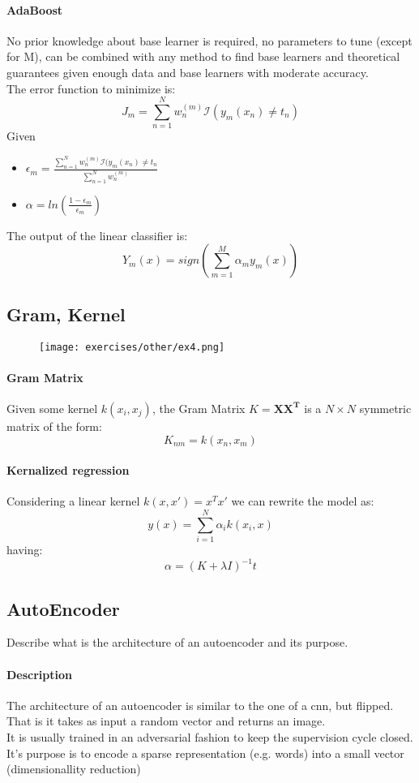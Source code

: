 \paragraph{AdaBoost}
No prior knowledge about base learner is required, no parameters to tune (except for M), can be combined with any method to find base learners and theoretical guarantees given enough data and base learners with moderate accuracy.\\
The error function to minimize is:
\[J_m=\sum_{n=1}^N w_n^{(m)}\mathcal{I}(y_m(x_n)\neq t_n)\]
Given 
\begin{itemize}
\item $\epsilon_m = \frac{\sum_{n=1}^N w_n^{(m)}\mathcal{I}(y_m(x_n)\neq t_n}{\sum_{n=1}^N w_n^{(m)}}$
\item $\alpha=ln(\frac{1-\epsilon_m}{\epsilon_m})$
\end{itemize}
The output of the linear classifier is:
\[Y_m(x)=sign(\sum_{m=1}^M\alpha_my_m(x))\]



\subsection{Gram, Kernel}

\begin{figure}[H]
    \centering
    \texttt{[image: exercises/other/ex4.png]}
\end{figure}
\paragraph{Gram Matrix}
Given some kernel $k(x_i,x_j)$, the Gram Matrix $K=\bm{XX^T}$ is a $N\times N$ symmetric matrix of the form:
\[K_{nm}=k(x_n,x_m)\]

\paragraph{Kernalized regression}
Considering a linear kernel $k(x,x')=x^Tx'$ we can rewrite the model as:
\[y(x)=\sum_{i=1}^N\alpha_i k(x_i,x)\]
having:
\[\alpha=(K+\lambda I)^{-1}t\]


\subsection{AutoEncoder}
Describe what is the architecture of an autoencoder and its purpose.

\paragraph{Description}
The architecture of an autoencoder is similar to the one of a cnn, but flipped. That is it takes as input a random vector and returns an image.\\
It is usually trained in an adversarial fashion to keep the supervision cycle closed.\\
It's purpose is to encode a sparse representation (e.g. words) into a small vector (dimensionallity reduction)

